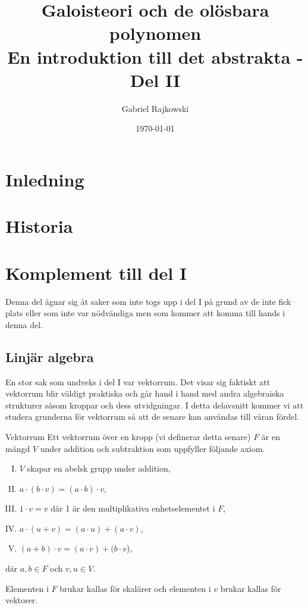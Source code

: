 \documentclass{article}
\theoremstyle{definition}
\begin{document}
\title{%
  Galoisteori och de olösbara polynomen \\
  \small{En introduktion till det abstrakta - Del II}
}
\author{Gabriel Rajkowski}
\date{\today}

\maketitle

\thispagestyle{empty}

\clearpage
\tableofcontents
\section{Inledning}
\section{Historia}
\section{Komplement till del I}
Denna del ägnar sig åt saker som inte togs upp i del I på grund av de inte fick plats eller som inte var nödvändiga men som kommer att komma 
till hands i denna del.
\subsection{Linjär algebra}
En stor sak som undveks i del I var vektorrum. Det visar sig faktiskt att vektorrum blir väldigt praktiska och går hand i hand med andra 
algebraiska strukturer såsom kroppar och dess utvidgningar. I detta delavsnitt kommer vi att studera grunderna för vektorrum så att de senare kan användas till 
våran fördel.

\begin{mydef}{Vektorrum}{}
  Ett vektorrum över en kropp (vi definerar detta senare) $F$ är en mängd $V$ under addition och subtraktion som uppfyller följande axiom.
  \begin{enumerate}[I)]
    \item $V$ skapar en abelsk grupp under addition,
    \item $a \cdot (b \cdot v) = (a \cdot b) \cdot v$,
    \item $1 \cdot v = v$ där 1 är den multiplikativa enhetselementet i $F$,
    \item $a \cdot (u + v) = (a \cdot u) + (a \cdot v)$,
    \item $(a + b) \cdot v = (a \cdot v) + (b \cdot v$),
  \end{enumerate}
  där $a, b \in F$ och $v, u \in V$.
\end{mydef}
Elementen i $F$ brukar kallas för skalärer och elementen i $v$ 
brukar kallas för vektorer. 
\end{document}
